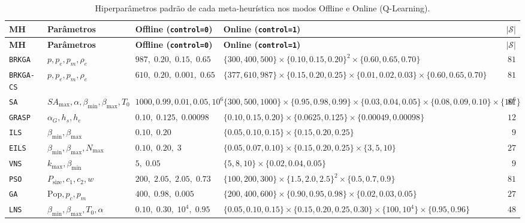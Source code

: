\documentclass[11pt,a4paper]{article}
\begin{document}
\begin{small}
\begin{longtable}{@{}llp{4.3cm}p{5.5cm}r@{}}
\caption{Hiperparâmetros padrão de cada meta-heurística nos modos Offline e Online (Q-Learning).}
\label{tab:parametros}\\
\toprule
\textbf{MH} & \textbf{Parâmetros} & \textbf{Offline (\texttt{control=0})} & \textbf{Online (\texttt{control=1})} & $|\mathcal{S}|$ \\
\midrule
\endfirsthead
\toprule
\textbf{MH} & \textbf{Parâmetros} & \textbf{Offline (\texttt{control=0})} & \textbf{Online (\texttt{control=1})} & $|\mathcal{S}|$ \\
\midrule
\endhead
\bottomrule
\endfoot
\texttt{BRKGA} & $p, p_e, p_m, \rho_e$ & $987,\; 0.20,\; 0.15,\; 0.65$ & $\{300,400,500\}\times\{0.10,0.15,0.20\}^2\times\{0.60,0.65,0.70\}$ & $81$ \\
\texttt{BRKGA-CS} & $p, p_e, p_m, \rho_e$ & $610,\; 0.20,\; 0.001,\; 0.65$ & $\{377,610,987\}\times\{0.15,0.20,0.25\}\times\{0.01,0.02,0.03\}\times\{0.60,0.65,0.70\}$ & $81$ \\
\texttt{SA} & $SA_{\max}, \alpha, \beta_{\min}, \beta_{\max}, T_0$ & $1000, 0.99, 0.01, 0.05, 10^6$ & $\{300,500,1000\}\times\{0.95,0.98,0.99\}\times\{0.03,0.04,0.05\}\times\{0.08,0.09,0.10\}\times\{10^6\}$ & $81$ \\
\texttt{GRASP} & $\alpha_G, h_s, h_e$ & $0.10,\; 0.125,\; 0.00098$ & $\{0.10,0.15,0.20\}\times\{0.0625,0.125\}\times\{0.00049,0.00098\}$ & $12$ \\
\texttt{ILS} & $\beta_{\min}, \beta_{\max}$ & $0.10,\; 0.20$ & $\{0.05,0.10,0.15\}\times\{0.15,0.20,0.25\}$ & $9$ \\
\texttt{EILS} & $\beta_{\min}, \beta_{\max}, N_{\max}$ & $0.10,\; 0.20,\; 3$ & $\{0.05,0.07,0.10\}\times\{0.15,0.20,0.25\}\times\{3,5,10\}$ & $27$ \\
\texttt{VNS} & $k_{\max}, \beta_{\min}$ & $5,\; 0.05$ & $\{5,8,10\}\times\{0.02,0.04,0.05\}$ & $9$ \\
\texttt{PSO} & $P_{\text{size}}, c_1, c_2, w$ & $200,\; 2.05,\; 2.05,\; 0.73$ & $\{100,200,300\}\times\{1.5,2.0,2.5\}^2\times\{0.5,0.7,0.9\}$ & $81$ \\
\texttt{GA} & $\text{Pop}, p_c, p_m$ & $400,\; 0.98,\; 0.005$ & $\{200,400,600\}\times\{0.90,0.95,0.98\}\times\{0.02,0.03,0.05\}$ & $27$ \\
\texttt{LNS} & $\beta_{\min}, \beta_{\max}, T_0, \alpha$ & $0.10,\; 0.30,\; 10^4,\; 0.95$ & $\{0.05,0.10,0.15\}\times\{0.15,0.20,0.25,0.30\}\times\{100,10^4\}\times\{0.95,0.96\}$ & $48$ \\

\end{longtable}
\end{small}
\end{document}
